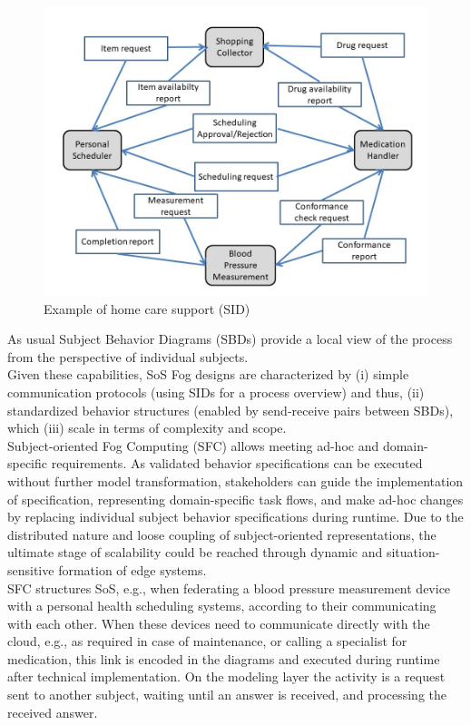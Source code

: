 \begin{figure}[htbp]
	\centering
	\includegraphics[width=0.6\linewidth] {Figures/Chapter5/Fog/homeCare.jpg}
	\caption[Example of home care support (SID)]{Example of home care support (SID)}
	\label{fig:homeCare}
\end{figure}


As usual Subject Behavior Diagrams (SBDs) provide a local view of the process from the perspective of individual subjects. 
\\
Given these capabilities, SoS Fog designs are characterized by (i) simple communication protocols (using SIDs for a process overview) and thus, (ii) standardized behavior structures (enabled by send-receive pairs between SBDs), which (iii) scale in terms of complexity and scope. 
\\
Subject-oriented Fog Computing (SFC) allows meeting ad-hoc and domain-specific requirements. As validated behavior specifications can be executed without further model transformation, stakeholders can guide the implementation of specification, representing domain-specific task flows, and make ad-hoc changes by replacing individual subject behavior specifications during runtime. Due to the distributed nature and loose coupling of subject-oriented representations, the ultimate stage of scalability could be reached through dynamic and situation-sensitive formation of edge systems.
\\
SFC structures SoS, e.g., when federating a blood pressure measurement device with a personal health scheduling systems, according to their communicating with each other. When these devices need to communicate directly with the cloud, e.g., as required in case of maintenance, or calling a specialist for medication, this link is encoded in the diagrams and executed during runtime after technical implementation. On the modeling layer the activity is a request sent to another subject, waiting until an answer is received, and processing the received answer. 

